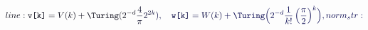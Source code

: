 \documentclass[12pt]{article}
\begin{document}
\makeatletter
\renewcommand*{\@textcolor}[3]{%
  \protect\leavevmode
  \begingroup
    \color#1{#2}#3%
  \endgroup
}
\makeatother
\begin{displaymath}
\mathcolor[RGB]{0,0,15}{line:
\texttt{v[k]}=V(k)+\Turing(2^{-d}} \mathcolor[RGB]{0,0,30}{\frac{4}{\pi}} \mathcolor[RGB]{0,0,45}{2^{2k}} \mathcolor[RGB]{0,0,60}{),\quad\texttt{w[k]}=W(k)} \mathcolor[RGB]{0,0,75}{+\Turing\Bigl(2^{-d}\frac{1}{k!}\left(\frac{\pi}{2}\right)^k\Bigr),

norm_str:}
\end{displaymath}
\end{document}
